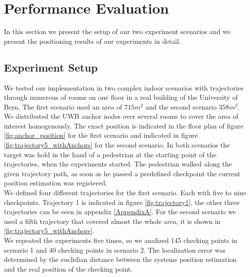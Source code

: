 
\chapter{Performance Evaluation} %

\label{Chapter6} %
In this section we present the setup of our two experiment scenarios and we present the positioning results of our experiments in detail.


\section{Experiment Setup}
We tested our implementation in two complex indoor scenarios with trajectories through numerous of rooms on one floor in a real building of the University of Bern. The first scenario used an area of $715m^2$ and the second scenario $358m^2$. We distributed the UWB anchor nodes over several rooms to cover the area of interest homogenously. The exact position is indicated in the floor plan of figure \ref{fig:anchor_position} for the first scenario and indicated in figure \ref{fig:trajectory5_withAnchors} for the second scenario. In both scenarios the target was hold in the hand of a pedestrian at the starting point of the trajectories, when the experiments started. The pedestrian walked along the given trajectory path, as soon as he passed a predefined checkpoint the current position estimation was registered.\\
\noindent\hspace*{5mm}%
We defined four different trajectories for the first scenario. Each with five to nine checkpoints. Trajectory 1 is indicated in figure \ref{fig:trajectory1}, the other three trajectories can be seen in appendix \ref{AppendixA}. For the second scenario we used a fifth trajectory that covered almost the whole area, it is shown in \ref{fig:trajectory5_withAnchors}.\\
\noindent\hspace*{5mm}%
We repeated the experiments five times, so we analized 145 checking points in scenario 1 and 40 checking points in scenario 2. The localization error was determined by the euclidian distance between the systems position estimation and the real position of the checking point. 



